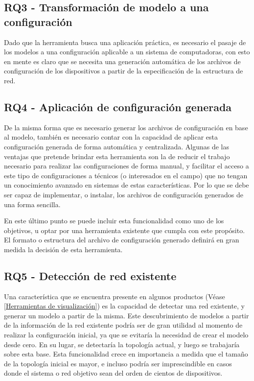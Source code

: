 \subsection{RQ3 - Transformación de modelo a una configuración} \label{RQ3}
Dado que la herramienta busca una aplicación práctica, es necesario el pasaje de los modelos a una configuración aplicable a un sistema de computadoras, con esto en mente es claro que se necesita una generación automática de los archivos de configuración de los dispositivos a partir de la especificación de la estructura de red.

\subsection{RQ4 - Aplicación de configuración generada} \label{RQ4}
De la misma forma que es necesario generar los archivos de configuración en base al modelo, también es necesario contar con la capacidad de aplicar esta configuración generada de forma automática y centralizada. Algunas de las ventajas que pretende brindar esta herramienta son la de reducir el trabajo necesario para realizar las configuraciones de forma manual, y facilitar el acceso a este tipo de configuraciones a técnicos (o interesados en el campo) que no tengan un conocimiento avanzado en sistemas de estas características. Por lo que se debe ser capaz de implementar, o instalar, los archivos de configuración generados de una forma sencilla. 

En este último punto se puede incluir esta funcionalidad como uno de los objetivos, u optar por una herramienta existente que cumpla con este propósito. El formato o estructura del archivo de configuración generado definirá en gran medida la decisión de esta herramienta.

\subsection{RQ5 - Detección de red existente} \label{RQ5}
Una característica que se encuentra presente en algunos productos (Véase \ref{Herramientas de visualización}) es la capacidad de detectar una red existente, y generar un modelo a partir de la misma. Este descubrimiento de modelos a partir de la información de la red existente podría ser de gran utilidad al momento de realizar la configuración inicial, ya que se evitaría la necesidad de crear el modelo desde cero. En su lugar, se detectaría la topología actual, y luego se trabajaría sobre esta base. Esta funcionalidad crece en importancia a medida que el tamaño de la topología inicial es mayor, e incluso podría ser imprescindible en casos donde el sistema o red objetivo sean del orden de cientos de dispositivos. 

